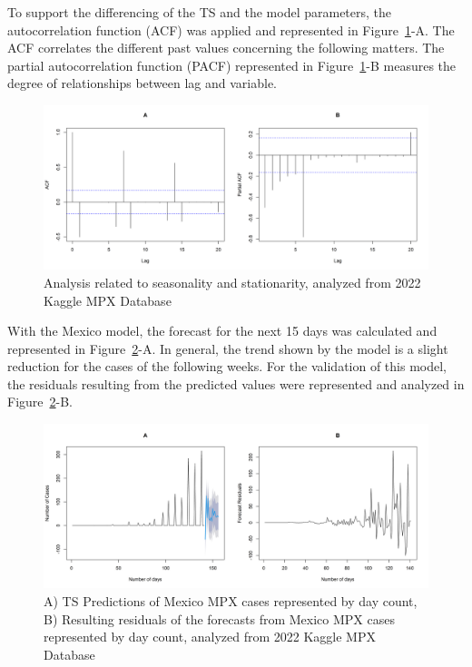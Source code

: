 \documentclass[conference]{IEEEtran}
\begin{document}
To support the differencing of the TS and the model parameters, the autocorrelation function (ACF) was applied and represented in Figure~\ref{fig:ACF&PACF}-A. The ACF correlates the different past values concerning the following matters. The partial autocorrelation function (PACF) represented in Figure~\ref{fig:ACF&PACF}-B measures the degree of relationships between lag and variable.
\begin{figure}[H]
    \centering
    \includegraphics[width = 8 cm]{ACF&PACF.png}
    \caption{Analysis related to seasonality and stationarity, analyzed from 2022 Kaggle MPX Database~\cite{Contractor2022}}
    \label{fig:ACF&PACF}
\end{figure}

With the Mexico model, the forecast for the next 15 days was calculated and represented in Figure~\ref{fig:Forecast&Residuals}-A. In general, the trend shown by the model is a slight reduction for the cases of the following weeks. For the validation of this model, the residuals resulting from the predicted values were represented and analyzed in Figure~\ref{fig:Forecast&Residuals}-B. 
\begin{figure}[H]
    \centering
    \includegraphics[width = 8 cm]{Forecast&Residuals.png}
    \caption{A) TS Predictions of Mexico MPX cases represented by day count, B) Resulting residuals of the forecasts from Mexico MPX cases represented by day count, analyzed from 2022 Kaggle MPX Database~\cite{Contractor2022}}
    \label{fig:Forecast&Residuals}
\end{figure}
\end{document}
